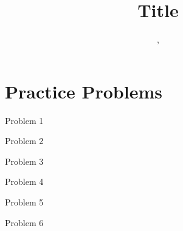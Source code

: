 \documentclass[11.5pt]{article}
\title{Title}
\author{\shira, \tim}
\begin{document}
\maketitle

\begin{notes}

\end{notes} 

\section*{Practice Problems} 


\begin{exercise}{Problem 1}
\end{exercise}

\begin{solution}{3}
\end{solution}


\begin{exercise}{Problem 2}
\end{exercise}

\begin{solution}{3}
\end{solution}


\begin{exercise}{Problem 3}
\end{exercise}

\begin{solution}{3}
\end{solution}


\begin{exercise}{Problem 4}
\end{exercise}

\begin{solution}{3}
\end{solution}


\begin{exercise}{Problem 5}
\end{exercise}

\begin{solution}{3}
\end{solution}


\begin{exercise}{Problem 6}
\end{exercise}

\begin{solution}{3}
\end{solution}

\end{document}
